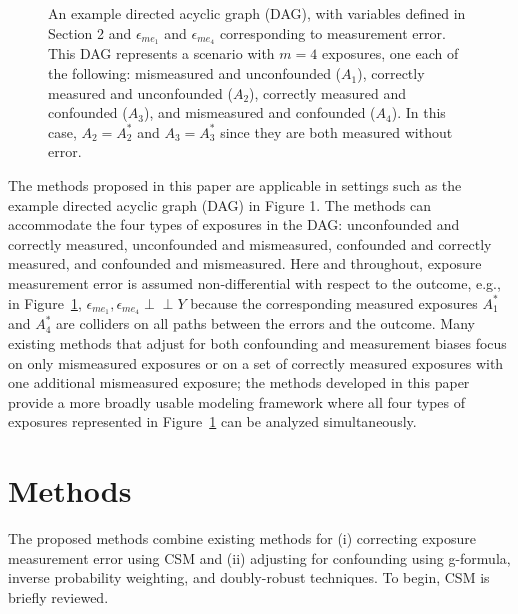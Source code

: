 \documentclass[useAMS,usenatbib,referee]{biom}
\begin{document}
\begin{figure}
\centering
{}
\caption{An example directed acyclic graph (DAG), with variables defined in Section 2 and $\epsilon_{me_{1}}$ and $\epsilon_{me_{4}}$ corresponding to measurement error. This DAG represents a scenario with $m=4$ exposures, one each of the following: mismeasured and unconfounded ($A_{1}$), correctly measured and unconfounded ($A_{2}$), correctly measured and confounded ($A_{3}$), and mismeasured and confounded ($A_{4}$). In this case, $A_{2} = A^{*}_{2}$ and $A_{3} = A^{*}_{3}$ since they are both measured without error.}
\label{fig:one}
\end{figure}

The methods proposed in this paper are applicable in settings such as the example directed acyclic graph (DAG) in Figure 1. The methods can accommodate the four types of exposures in the DAG: unconfounded and correctly measured, unconfounded and mismeasured, confounded and correctly measured, and confounded and mismeasured. Here and throughout, exposure measurement error is assumed non-differential with respect to the outcome, e.g., in Figure~\ref{fig:one}, $\epsilon_{me_{1}}, \epsilon_{me_{4}} \perp \!\!\! \perp Y$ because the corresponding measured exposures $A^{*}_{1}$ and $A^{*}_{4}$ are colliders on all paths between the errors and the outcome. Many existing methods that adjust for both confounding and measurement biases focus on only mismeasured exposures or on a set of correctly measured exposures with one additional mismeasured exposure; the methods developed in this paper provide a more broadly usable modeling framework where all four types of exposures represented in Figure~\ref{fig:one} can be analyzed simultaneously.

\section{Methods}
\label{s:methods}

The proposed methods combine existing methods for (i) correcting exposure measurement error using CSM and (ii) adjusting for confounding using g-formula, inverse probability weighting, and doubly-robust techniques. To begin, CSM is briefly reviewed.
\end{document}
